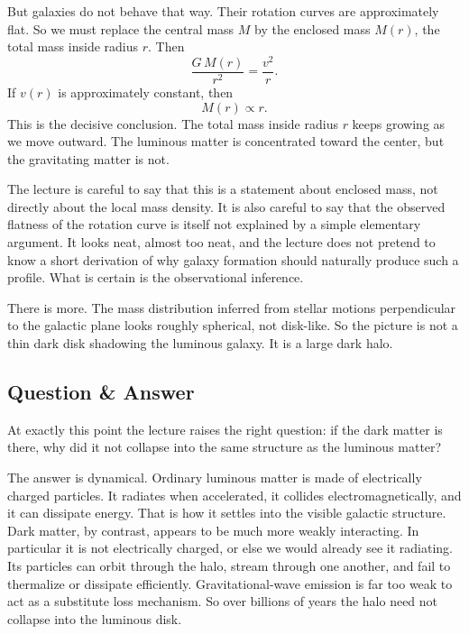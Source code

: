 But galaxies do not behave that way. Their rotation curves are approximately flat. So we must replace the central mass \(M\) by the enclosed mass \(M(r)\), the total mass inside radius \(r\). Then
\begin{equation}
\frac{G\,M(r)}{r^2}=\frac{v^2}{r}.
\end{equation}
If \(v(r)\) is approximately constant, then
\begin{equation}
M(r)\propto r.
\end{equation}
This is the decisive conclusion. The total mass inside radius \(r\) keeps growing as we move outward. The luminous matter is concentrated toward the center, but the gravitating matter is not.

The lecture is careful to say that this is a statement about enclosed mass, not directly about the local mass density. It is also careful to say that the observed flatness of the rotation curve is itself not explained by a simple elementary argument. It looks neat, almost too neat, and the lecture does not pretend to know a short derivation of why galaxy formation should naturally produce such a profile. What is certain is the observational inference.

There is more. The mass distribution inferred from stellar motions perpendicular to the galactic plane looks roughly spherical, not disk-like. So the picture is not a thin dark disk shadowing the luminous galaxy. It is a large dark halo.

\subsection{Question \& Answer}

At exactly this point the lecture raises the right question: if the dark matter is there, why did it not collapse into the same structure as the luminous matter?

The answer is dynamical. Ordinary luminous matter is made of electrically charged particles. It radiates when accelerated, it collides electromagnetically, and it can dissipate energy. That is how it settles into the visible galactic structure. Dark matter, by contrast, appears to be much more weakly interacting. In particular it is not electrically charged, or else we would already see it radiating. Its particles can orbit through the halo, stream through one another, and fail to thermalize or dissipate efficiently. Gravitational-wave emission is far too weak to act as a substitute loss mechanism. So over billions of years the halo need not collapse into the luminous disk.

